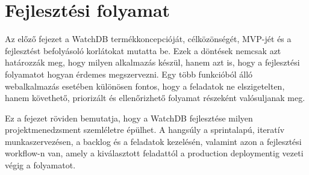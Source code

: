 \chapter{Fejlesztési folyamat}

Az előző fejezet a WatchDB termékkoncepcióját, célközönségét, MVP-jét és a fejlesztést befolyásoló korlátokat mutatta be. Ezek a döntések nemcsak azt határozzák meg, hogy milyen alkalmazás készül, hanem azt is, hogy a fejlesztési folyamatot hogyan érdemes megszervezni. Egy több funkcióból álló webalkalmazás esetében különösen fontos, hogy a feladatok ne elszigetelten, hanem követhető, priorizált és ellenőrizhető folyamat részeként valósuljanak meg.

Ez a fejezet röviden bemutatja, hogy a WatchDB fejlesztése milyen projektmenedzsment szemléletre épülhet. A hangsúly a sprintalapú, iteratív munkaszervezésen, a backlog és a feladatok kezelésén, valamint azon a fejlesztési workflow-n van, amely a kiválasztott feladattól a production deploymentig vezeti végig a folyamatot.




